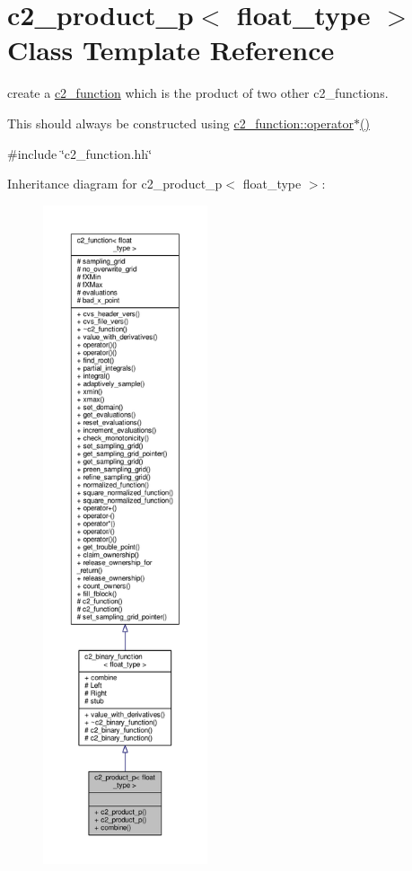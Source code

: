 \hypertarget{classc2__product__p}{}\section{c2\+\_\+product\+\_\+p$<$ float\+\_\+type $>$ Class Template Reference}
\label{classc2__product__p}


create a \hyperlink{classc2__function}{c2\+\_\+function} which is the product of two other c2\+\_\+functions.

This should always be constructed using \hyperlink{classc2__function_a7744675c98a8ec63320ac1c0b61bec9c}{c2\+\_\+function\+::operator$\ast$()}  




{\ttfamily \#include \char`\"{}c2\+\_\+function.\+hh\char`\"{}}



Inheritance diagram for c2\+\_\+product\+\_\+p$<$ float\+\_\+type $>$\+:
\nopagebreak
\begin{figure}[H]
\begin{center}
\leavevmode
\includegraphics[height=550pt]{classc2__product__p__inherit__graph}
\end{center}
\end{figure}


